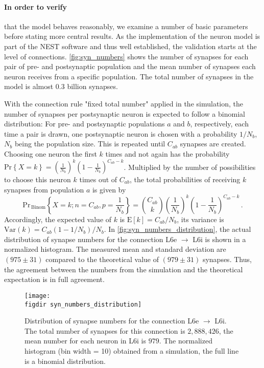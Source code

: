 \paragraph{In order to verify} that the model behaves reasonably, we examine a number of basic parameters 
before stating more central results. As the implementation of the neuron model
is part of the NEST software and thus well established, the validation starts at the level 
of connections. \autoref{fig:syn_numbers} shows the number of synapses for each pair 
of pre- and postsynaptic population and 
the mean number of synapses each neuron receives from a specific population. The total number 
of synapses in the model is almost 0.3 billion synapses.  

With the connection rule "fixed total number" applied in the simulation, 
the number of synapses per postsynaptic neuron is expected to follow a binomial distribution:
For pre- and postsynaptic populations $a$ and $b$, respectively, 
each time a pair is drawn, one postsynaptic neuron is chosen with a probability 
$1 / N_b$, $N_b$ being the population size. This is repeated until $C_{ab}$ synapses are
created. 
Choosing one neuron the first $k$ times and not again has the probability 
$\text{Pr}\left\{X = k\right\} = 
\left( \frac{1}{N_b} \right)^{k} 
\left( 1 - \frac{1}{N_b} \right)^{C_{ab} - k}$.
Multiplied by the number of possibilities to choose this neuron $k$ times out of 
$C_{ab}$, the total probabilities of receiving $k$ synapses from population $a$ is
given by
\begin{equation}
    \text{Pr}_{\,\text{Binom}}\left\{X = k; n=C_{ab}, p=\frac{1}{N_b}\right\} = 
        {C_{ab}\choose{k}} 
        \left( \frac{1}{N_b} \right)^{k} 
        \left( 1 - \frac{1}{N_b} \right)^{C_{ab} - k} \,.
    \label{eq:binomial}
\end{equation}
Accordingly, the expected value of $k$ is $\text{E}[k] = C_{ab} / N_b$, its variance is 
$\text{Var}(k) = C_{ab} (1 - 1/N_b) / N_b$. 
In \autoref{fig:syn_numbers_distribution}, the actual distribution of synapse numbers 
for the connection L6e $\to$ L6i is shown in a normalized histogram. 
The measured mean and standard deviation are $(975 \pm 31)$ compared to the theoretical 
value of $(979 \pm 31)$ synapses. 
Thus, the agreement between the numbers from the simulation and the theoretical expectation is
in full agreement. 
\begin{figure}[tb]
    \centering
    \texttt{[image: \\figdir syn\_numbers\_distribution]}
    \caption[Distribution of synapse numbers]{
        Distribution of synapse numbers for the connection L6e $\to$ L6i.
        The total number of synapses for this connection is $2,888,426$, 
        the mean number for each neuron in L6i is $979$.
        The normalized histogram (bin width = 10) obtained 
        from a simulation, the full line is a binomial distribution.
    }
    \label{fig:syn_numbers_distribution}
\end{figure}

